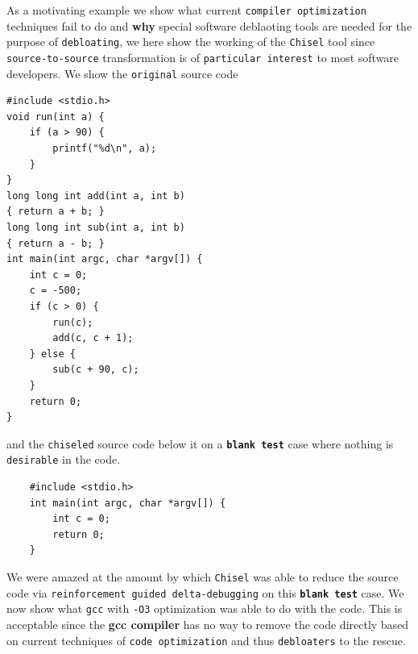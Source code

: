 \documentclass{relatorio}
\begin{document}
As a motivating example we show what current \texttt{compiler optimization} techniques fail to do and \textbf{why} special software deblaoting tools are needed for the purpose of \texttt{debloating}, we here show the working of the \texttt{Chisel} tool since \texttt{source-to-source} transformation is of \texttt{particular interest} to most software developers. We show the \texttt{original} source code

\begin{lstlisting}
#include <stdio.h>
void run(int a) {
	if (a > 90) {
		printf("%d\n", a);
	}
}
long long int add(int a, int b) 
{ return a + b; }
long long int sub(int a, int b) 
{ return a - b; }
int main(int argc, char *argv[]) {
	int c = 0;
	c = -500;
	if (c > 0) {
		run(c);
		add(c, c + 1);
	} else {
		sub(c + 90, c);
	}
	return 0;
}
\end{lstlisting} 

and the \texttt{chiseled} source code below it on a \textbf\texttt{blank test} case where nothing is \texttt{desirable} in the code. 

\begin{lstlisting}
	#include <stdio.h>
	int main(int argc, char *argv[]) {
		int c = 0;
		return 0;
	}
\end{lstlisting}

We were amazed at the amount by which \texttt{Chisel} was able to reduce the source code via \texttt{reinforcement guided delta-debugging} on this \textbf\texttt{blank test} case. We now show what \texttt{gcc} with \texttt{-O3} optimization was able to do with the code. This is acceptable since the \textbf{gcc compiler} has no way to remove the code directly based on current techniques of \texttt{code optimization} and thus \texttt{debloaters} to the rescue. 
\end{document}
